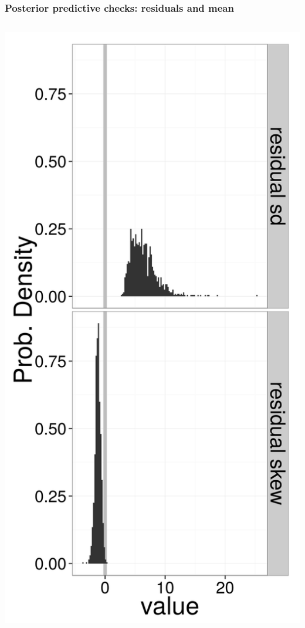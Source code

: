 \documentclass{beamer}
\begin{document}
\begin{frame}
  \frametitle{Posterior predictive checks: residuals and mean}
  \begin{columns}
    \begin{column}{0.5\textwidth}
      \begin{center}
        \includegraphics[height = 0.8\textheight, width = \textwidth,  keepaspectratio = true]{figure/res_sum_plot}

\end{center}
\end{column}
\end{columns}
\end{frame}
\end{document}
